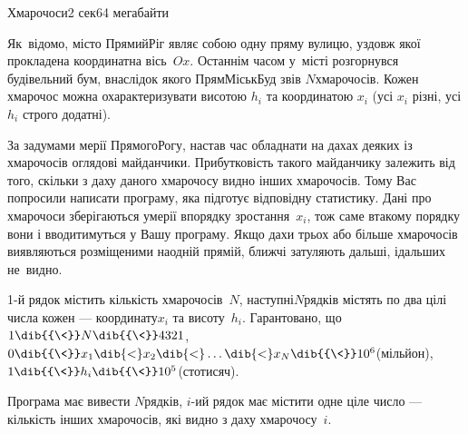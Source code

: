\vspace{10mm}\par
\begin{problem}{Хмарочоси}{\stdinOrInputTxt}{\stdoutOrOutputTxt}{2 сек}{64 мегабайти}

Як~відомо, місто Прямий\nolinebreak[2] Ріг являє собою одну пряму вулицю, уздовж якої прокладена координатна вісь~$Ox$. Останнім часом у~місті розгорнувся будівельний бум, внаслідок якого ПрямМіськБуд звів $N$\nolinebreak[3] хмарочосів. Кожен хмарочос можна охарактеризувати висотою $h_i$ та координатою $x_i$ (усі $x_i$ різні, усі $h_i$ строго додатні).

За задумами мерії Прямого\nolinebreak[2] Рогу, настав час обладнати на дахах деяких із хмарочосів оглядові майданчики. Прибутковість такого майданчику залежить від того, скільки з даху даного хмарочосу видно інших хмарочосів. Тому Вас попросили написати програму, яка підготує відповідну статистику. Дані про хмарочоси зберігаються у\nolinebreak[3] мерії в\nolinebreak[3] порядку зростання~$x_i$, тож саме в\nolinebreak[3] такому порядку вони і вводитимуться у Вашу програму. Якщо дахи трьох або більше хмарочосів виявляються розміщеними на\nolinebreak[2] одній прямій, ближчі затуляють дальші, і\nolinebreak[3] дальших не~видно.

\InputFile
\mbox{1-й} рядок містить кількість хмарочосів~$N$, наступні\nolinebreak[2] $N$\nolinebreak[3] рядків містять по два цілі числа кожен --- координату\nolinebreak[3] $x_i$ та висоту~$h_i$. Гарантовано, що ${1\dib{{\<}}N\dib{{\<}}4321}$, 
$0\dib{{\<}}x_1\dib{{<}}x_2\dib{{<}}\dots\dib{{<}}x_N\dib{{\<}}10^6$\nolinebreak[3] (мільйон),\linebreak[2] 
${1\dib{{\<}}h_i\dib{{\<}}10^5}$\nolinebreak[2] (сто\nolinebreak[3] тисяч). 

\OutputFile
Програма має вивести $N$\nolinebreak[3] рядків, $i$-ий рядок має містити одне ціле число --- кількість інших хмарочосів, які видно з даху хмарочосу \textnumero$\,i$.


\end{problem}
